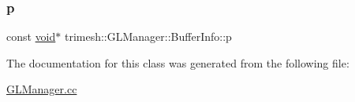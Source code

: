 \mbox{\label{classtrimesh_1_1GLManager_1_1BufferInfo_aaab05a6f7ef2421573cf5f58c3d52c19}} 
\subsubsection{\texorpdfstring{p}{p}}
{\footnotesize\ttfamily const \hyperlink{namespacetrimesh_a784ddfd979e1c579bda795a8edfc3f43}{void}$\ast$ trimesh\+::\+G\+L\+Manager\+::\+Buffer\+Info\+::p}



The documentation for this class was generated from the following file\+:\begin{DoxyCompactItemize}
\item 
\hyperlink{GLManager_8cc}{G\+L\+Manager.\+cc}\end{DoxyCompactItemize}
